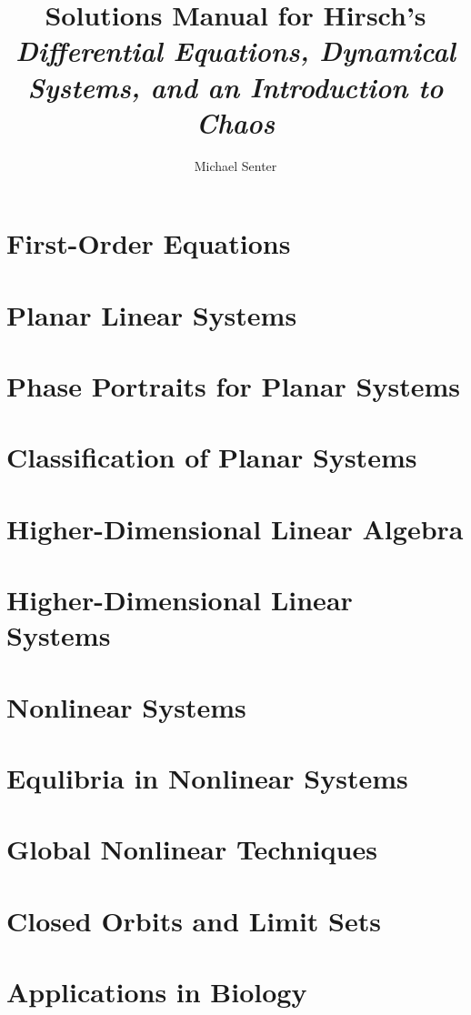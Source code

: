 \documentclass[12pt]{book}
\begin{document}
\title{Solutions Manual for Hirsch's \\ \emph{Differential Equations, Dynamical Systems, and an Introduction to Chaos}}%
\author{Michael Senter}

\maketitle


\chapter{First-Order Equations }


\chapter{Planar Linear Systems }
\chapter{Phase Portraits for Planar Systems }
\chapter{Classification of Planar Systems }
\chapter{Higher-Dimensional Linear Algebra }
\chapter{Higher-Dimensional Linear Systems }
\chapter{Nonlinear Systems }
\chapter{Equlibria in Nonlinear Systems }
\chapter{Global Nonlinear Techniques }
\chapter{Closed Orbits and Limit Sets }
\chapter{Applications in Biology }
\end{document}
